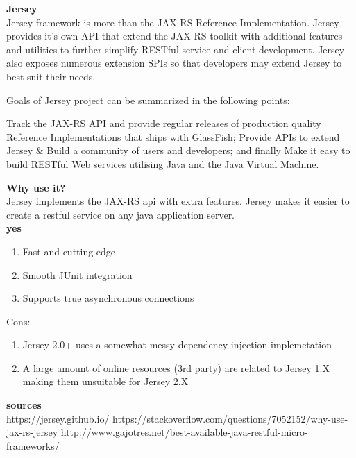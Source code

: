 \textbf{Jersey}\\
Jersey framework is more than the JAX-RS Reference Implementation. Jersey provides it’s own API that extend the JAX-RS toolkit with additional features and utilities to further simplify RESTful service and client development. Jersey also exposes numerous extension SPIs so that developers may extend Jersey to best suit their needs.

Goals of Jersey project can be summarized in the following points:

Track the JAX-RS API and provide regular releases of production quality Reference Implementations that ships with GlassFish;
Provide APIs to extend Jersey \& Build a community of users and developers; and finally
Make it easy to build RESTful Web services utilising Java and the Java Virtual Machine.


\textbf{Why use it?} \\
Jersey implements the JAX-RS api with extra features. Jersey makes it easier to create a restful service on any java application server. \\

\textbf{yes}

\begin{enumerate}
	\item Fast and cutting edge
	\item Smooth JUnit integration
	\item Supports true asynchronous connections
\end{enumerate}
Cons:
\begin{enumerate}
	\item Jersey 2.0+ uses a somewhat messy dependency injection implemetation
	\item A large amount of online resources (3rd party) are related to Jersey 1.X making them unsuitable for Jersey 2.X
\end{enumerate}

\textbf{sources}\\
https://jersey.github.io/
https://stackoverflow.com/questions/7052152/why-use-jax-rs-jersey
http://www.gajotres.net/best-available-java-restful-micro-frameworks/